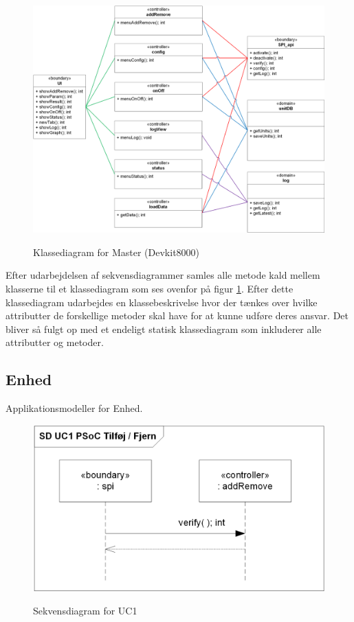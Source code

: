 \clearpage
\begin{figure}[htbp] \centering
{\includegraphics[width=\textwidth]{filer/design/sw_class_devkit}}
\caption{Klassediagram for Master (Devkit8000)}
\label{fig:klassediagram devkit8000}
\end{figure} 

Efter udarbejdelsen af sekvensdiagrammer samles alle metode kald mellem klasserne til et klassediagram som ses ovenfor på figur \ref{fig:klassediagram devkit8000}. Efter dette klassediagram udarbejdes en klassebeskrivelse hvor der tænkes over hvilke attributter de forskellige metoder skal have for at kunne udføre deres ansvar. Det bliver så fulgt op med et endeligt statisk klassediagram som inkluderer alle attributter og metoder.

\clearpage
\subsection{Enhed}
Applikationsmodeller for Enhed.

\begin{figure}[htbp] \centering
{\includegraphics[scale=1]{filer/design/a_psoc_uc1}}
\caption{Sekvensdiagram for UC1}
\label{fig:psoc_sd_uc1}
\end{figure} 

